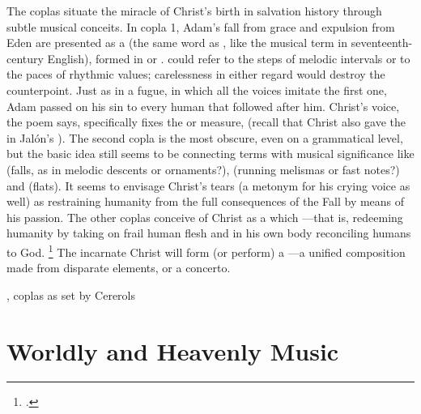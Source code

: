 
The coplas situate the miracle of Christ's birth in salvation history through
subtle musical conceits.
In copla 1, Adam's fall from grace and expulsion from Eden are presented as a
 (the same word as , like the musical term
 in seventeenth-century English), formed in 
or . 
 could refer to the steps of melodic intervals or to the paces
of rhythmic values; carelessness in either regard would destroy the
counterpoint.
Just as in a fugue, in which all the voices imitate the first one, Adam passed
on his sin to every human that followed after him.
Christ's voice, the poem says, specifically fixes the  or measure,
 (recall that Christ also gave the
 in Jalón's ).
The second copla is the most obscure, even on a grammatical level, but the basic
idea still seems to be connecting terms with musical significance like
 (falls, as in melodic descents or ornaments?), 
(running melismas or fast notes?) and  (flats).
It seems to envisage Christ's tears (a metonym for his crying voice as well) as
restraining humanity from the full consequences of the Fall by means of his
passion.
The other coplas conceive of Christ as a  which
---that is, redeeming
humanity by taking on frail human flesh and in his own body reconciling humans
to God.%
    \footnote{.}
The incarnate Christ will form (or perform) a ---a unified
composition made from disparate elements, or a concerto.


\begin{poemexample}
    \caption{, coplas as set by Cererols}
    \label{poem:Suspended_cielos-coplas}
\end{poemexample}


\section{Worldly and Heavenly Music}

